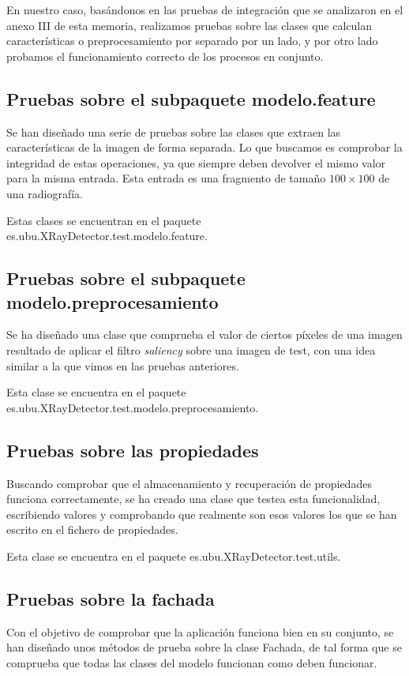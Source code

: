En nuestro caso, basándonos en las pruebas de integración que se analizaron en el anexo III de esta memoria, realizamos pruebas sobre las clases que calculan características o preprocesamiento por separado por un lado, y por otro lado probamos el funcionamiento correcto de los procesos en conjunto.

\subsection{Pruebas sobre el subpaquete modelo.feature}
Se han diseñado una serie de pruebas sobre las clases que extraen las características de la imagen de forma separada. Lo que buscamos es comprobar la integridad de estas operaciones, ya que siempre deben devolver el mismo valor para la misma entrada. Esta entrada es una fragmento de tamaño $100\times100$ de una radiografía.

Estas clases se encuentran en el paquete es.ubu.XRayDetector.test.modelo.feature.

\subsection{Pruebas sobre el subpaquete modelo.preprocesamiento}
Se ha diseñado una clase que comprueba el valor de ciertos píxeles de una imagen resultado de aplicar el filtro \textit{saliency} sobre una imagen de test, con una idea similar a la que vimos en las pruebas anteriores.

Esta clase se encuentra en el paquete es.ubu.XRayDetector.test.modelo.preprocesamiento.

\subsection{Pruebas sobre las propiedades}
Buscando comprobar que el almacenamiento y recuperación de propiedades funciona correctamente, se ha creado una clase que testea esta funcionalidad, escribiendo valores y comprobando que realmente son esos valores los que se han escrito en el fichero de propiedades.

Esta clase se encuentra en el paquete es.ubu.XRayDetector.test.utils.

\subsection{Pruebas sobre la fachada}
Con el objetivo de comprobar que la aplicación funciona bien en su conjunto, se han diseñado unos métodos de prueba sobre la clase Fachada, de tal forma que se comprueba que todas las clases del modelo funcionan como deben funcionar.

